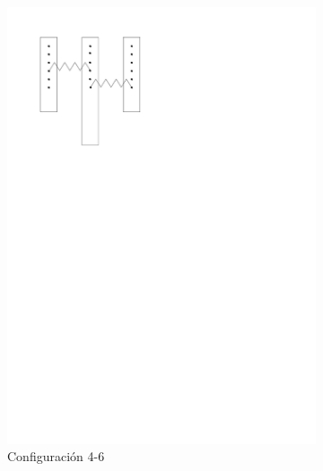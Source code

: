 \begin{figure}[htbp!]
	\begin{subfigure}[b]{0.3\textwidth}
		\centering
		\includegraphics[width=\linewidth]{./Figures/46.pdf}
		\caption{Configuración 4-6}
		\label{fig:conf-4-6}
	\end{subfigure}
	\hspace{0.1\textwidth}
	\begin{subfigure}[b]{0.3\textwidth}
		\centering

\end{subfigure}
\end{figure}
